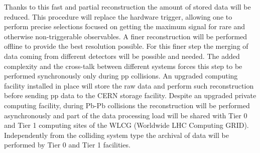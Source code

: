 Thanks to this fast and partial reconstruction the amount of stored data will be reduced.
This procedure will replace the hardware trigger, allowing one to perform precise selections focused on getting the maximum signal for rare and otherwise non-triggerable observables.
A finer reconstruction will be performed offline to provide the best resolution possible.
For this finer step the merging of data coming from different detectors will be possible and needed.
The added complexity and the cross-talk between different systems forces this step to be performed synchronously only during pp collisions.
An upgraded computing facility installed in place will store the raw data and perform such reconstruction before sending pp data to the CERN storage facility.
Despite an upgraded private computing facility, during Pb-Pb collisions the reconstruction will be performed asynchronously and part of the data processing load will be shared with Tier 0 and Tier 1 computing sites of the WLCG (Worldwide LHC Computing GRID).
Independently from the colliding system type the archival of data will be performed by Tier 0 and Tier 1 facilities.

